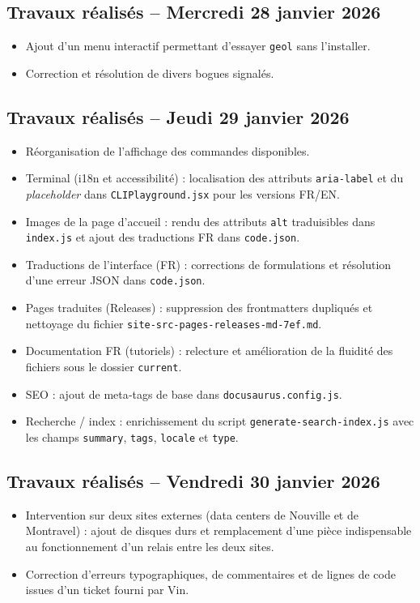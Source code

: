 \documentclass[12pt,a4paper]{report}
\begin{document}
\subsection*{Travaux réalisés -- Mercredi 28 janvier 2026}
\begin{itemize}
  \item Ajout d'un menu interactif permettant d'essayer \texttt{geol} sans l'installer.
  \item Correction et résolution de divers bogues signalés.
\end{itemize}

\subsection*{Travaux réalisés -- Jeudi 29 janvier 2026}
\begin{itemize}
  \item Réorganisation de l'affichage des commandes disponibles.
  \item Terminal (i18n et accessibilité) : localisation des attributs \texttt{aria-label} et du \emph{placeholder} dans \texttt{CLIPlayground.jsx} pour les versions FR/EN.
  \item Images de la page d'accueil : rendu des attributs \texttt{alt} traduisibles dans \texttt{index.js} et ajout des traductions FR dans \texttt{code.json}.
  \item Traductions de l'interface (FR) : corrections de formulations et résolution d'une erreur JSON dans \texttt{code.json}.
  \item Pages traduites (Releases) : suppression des frontmatters dupliqués et nettoyage du fichier \texttt{site-src-pages-releases-md-7ef.md}.
  \item Documentation FR (tutoriels) : relecture et amélioration de la fluidité des fichiers sous le dossier \texttt{current}.
  \item SEO : ajout de meta‑tags de base dans \texttt{docusaurus.config.js}.
  \item Recherche / index : enrichissement du script \texttt{generate-search-index.js} avec les champs \texttt{summary}, \texttt{tags}, \texttt{locale} et \texttt{type}.
\end{itemize}

\subsection*{Travaux réalisés -- Vendredi 30 janvier 2026}
\begin{itemize}
  \item Intervention sur deux sites externes (data centers de Nouville et de Montravel) : ajout de disques durs et remplacement d'une pièce indispensable au fonctionnement d'un relais entre les deux sites.
  \item Correction d'erreurs typographiques, de commentaires et de lignes de code issues d'un ticket fourni par Vin.
\end{itemize}
\end{document}
